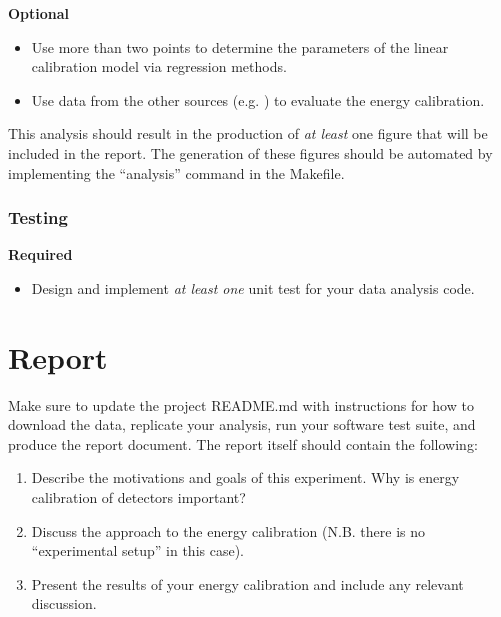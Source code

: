 \documentclass[11pt]{article}
\begin{document}
{\bf Optional}
\begin{itemize}
  \item Use more than two points to determine the parameters of the linear
        calibration model via regression methods.
  \item Use data from the other sources (e.g. ) to evaluate the
        energy calibration.
\end{itemize}

This analysis should result in the production of \textit{at least} one figure
that will be included in the report.
The generation of these figures should be automated by implementing the 
``analysis'' command in the Makefile.

\subsubsection*{Testing}

{\bf Required}
\begin{itemize}
  \item Design and implement \textit{at least one} unit test for your data
        analysis code.
\end{itemize}

\section*{Report}

Make sure to update the project README.md with instructions for how to 
download the data, replicate your analysis, run your software test suite, and
produce the report document.
The report itself should contain the following:

\begin{enumerate}
  \item Describe the motivations and goals of this experiment. Why is energy
        calibration of detectors important?
  \item Discuss the approach to the energy calibration (N.B. there is no
        ``experimental setup'' in this case).
  \item Present the results of your energy calibration and include any
        relevant discussion.
\end{enumerate}
\end{document}
